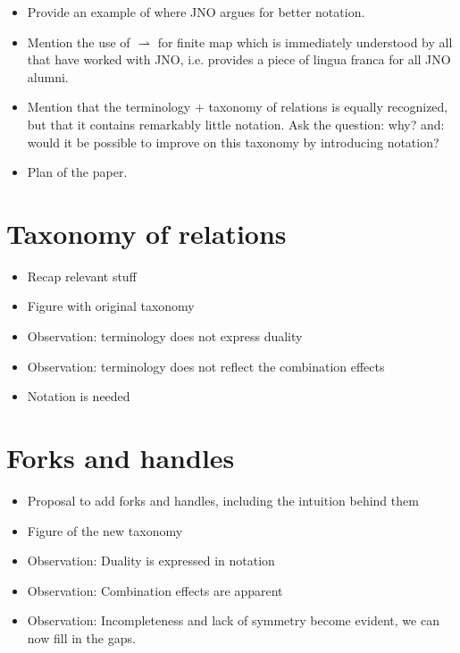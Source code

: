 \documentclass[runningheads,a4paper]{llncs}
\begin{document}
\begin{itemize}
\item Provide an example of where JNO argues for better notation.
\item Mention the use of $\rightharpoonup$ for finite map which is immediately understood by all that have worked with JNO, i.e. provides a piece of lingua franca for all JNO alumni.
\item Mention that the terminology + taxonomy of relations is equally recognized, but that it contains remarkably little notation. Ask the question: why? and: would it be possible to improve on this taxonomy by introducing notation?
\item Plan of the paper.
\end{itemize}

\section{Taxonomy of relations}

\begin{itemize}
\item Recap relevant stuff
\item Figure with original taxonomy
\item Observation: terminology does not express duality
\item Observation: terminology does not reflect the combination effects
\item Notation is needed
\end{itemize}

\section{Forks and handles}

\begin{itemize}
\item Proposal to add forks and handles, including the intuition behind them
\item Figure of the new taxonomy
\item Observation: Duality is expressed in notation
\item Observation: Combination effects are apparent
\item Observation: Incompleteness and lack of symmetry become evident, we can now fill in the gaps.
\end{itemize}
\end{document}
